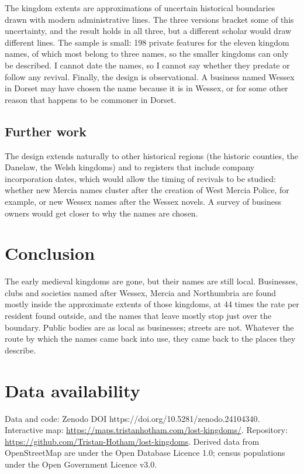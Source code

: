\documentclass[11pt,a4paper]{article}
\begin{document}
The kingdom extents are approximations of uncertain historical boundaries drawn with modern administrative lines. The three versions bracket some of this uncertainty, and the result holds in all three, but a different scholar would draw different lines. The sample is small: 198 private features for the eleven kingdom names, of which most belong to three names, so the smaller kingdoms can only be described. I cannot date the names, so I cannot say whether they predate or follow any revival. Finally, the design is observational. A business named Wessex in Dorset may have chosen the name because it is in Wessex, or for some other reason that happens to be commoner in Dorset.

\subsection{Further work}
The design extends naturally to other historical regions (the historic counties, the Danelaw, the Welsh kingdoms) and to registers that include company incorporation dates, which would allow the timing of revivals to be studied: whether new Mercia names cluster after the creation of West Mercia Police, for example, or new Wessex names after the Wessex novels. A survey of business owners would get closer to why the names are chosen.

\section{Conclusion}\label{sec:conc}
The early medieval kingdoms are gone, but their names are still local. Businesses, clubs and societies named after Wessex, Mercia and Northumbria are found mostly inside the approximate extents of those kingdoms, at 44 times the rate per resident found outside, and the names that leave mostly stop just over the boundary. Public bodies are as local as businesses; streets are not. Whatever the route by which the names came back into use, they came back to the places they describe.

\section*{Data availability}
Data and code: Zenodo DOI https://doi.org/10.5281/zenodo.24104340. Interactive map: \url{https://maps.tristanhotham.com/lost-kingdoms/}. Repository: \url{https://github.com/Tristan-Hotham/lost-kingdoms}. Derived data from OpenStreetMap are under the Open Database Licence 1.0; census populations under the Open Government Licence v3.0.
\end{document}
